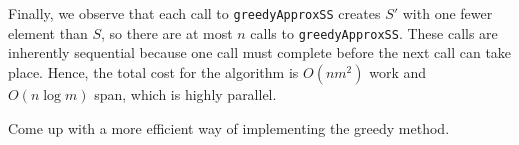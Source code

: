 Finally, we observe that each call to \texttt{greedyApproxSS} creates $S'$ with
one fewer element than $S$, so there are at most $n$ calls to
\texttt{greedyApproxSS}.  These calls are inherently sequential because one call
must complete before the next call can take place.  Hence, the total
cost for the algorithm is $O(n m^2)$ work and $O(n \log m)$ span,
which is highly parallel.


\begin{exercise}
Come up with a more efficient way of implementing the greedy method.
\end{exercise}

